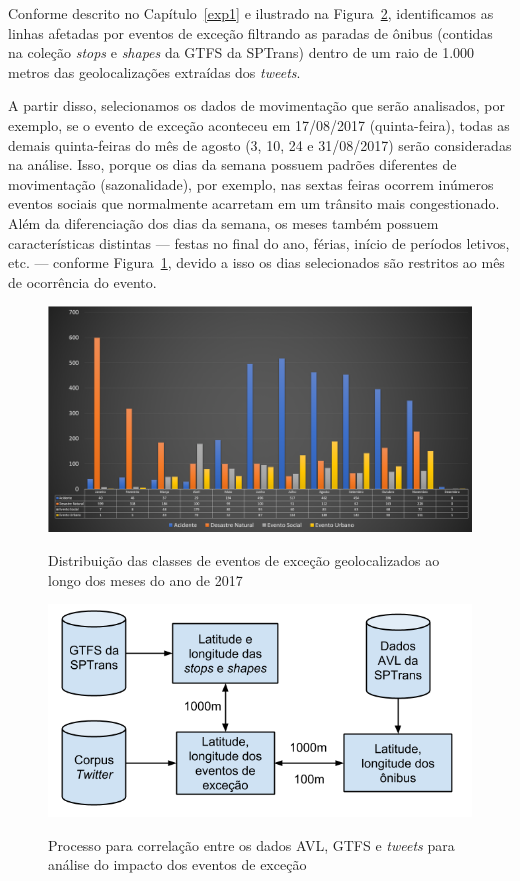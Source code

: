 \documentclass[
	12pt,				%
	oneside,			%
	a4paper,			%
	english,			%
	brazil				%
	]{abntex2ppgsi}
\begin{document}
{{{Conforme descrito no Capítulo~\ref{exp1} e ilustrado na Figura~\ref{fig:avl_tweets_correlation_pt}, identificamos as linhas afetadas por eventos de exceção filtrando as paradas de ônibus (contidas na coleção \textit{stops}  e \textit{shapes} da GTFS da SPTrans) dentro de um raio de 1.000 metros das geolocalizações extraídas dos \textit{tweets}. 

A partir disso, selecionamos os dados de movimentação que serão analisados, por exemplo, se o evento de exceção aconteceu em 17/08/2017 (quinta-feira), todas as demais quinta-feiras do mês de agosto (3, 10, 24 e 31/08/2017) serão consideradas na análise. Isso, porque os dias da semana possuem padrões diferentes de movimentação (sazonalidade), por exemplo, nas sextas feiras ocorrem inúmeros eventos sociais que normalmente acarretam em um trânsito mais congestionado. Além da diferenciação dos dias da semana, os meses também possuem características distintas --- festas no final do ano, férias, início de períodos letivos, etc. --- conforme Figura~\ref{fig:exception_events_classification_distribution}, devido a isso os dias selecionados são restritos ao mês de ocorrência do evento.

\begin{figure}[!htb]
	\centering
 	  \caption{Distribuição das classes de eventos de exceção geolocalizados ao longo dos meses do ano de 2017}
		\includegraphics[width=1\linewidth]{images/exception_events_classification_distribution_pt.png}
	\label{fig:exception_events_classification_distribution}
\end{figure}

\begin{figure}[!htb]
	\centering
 	  \caption{Processo para correlação entre os dados AVL, GTFS e \textit{tweets} para análise do impacto dos eventos de exceção}
		\includegraphics[width=0.7\linewidth]{images/avl_tweets_correlation_pt.png}
	\label{fig:avl_tweets_correlation_pt}
\end{figure}

}}}
\end{document}
